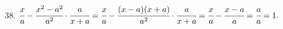 38. $\cfrac{x}{a}-\cfrac{x^2-a^2}{a^2}\cdot\cfrac{a}{x+a}=\cfrac{x}{a}-\cfrac{(x-a)(x+a)}{a^2}\cdot\cfrac{a}{x+a}=\cfrac{x}{a}-\cfrac{x-a}{a}=\cfrac{a}{a}=1.$\\
